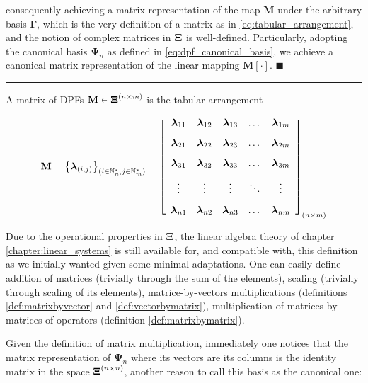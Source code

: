 	\noindent consequently achieving a matrix representation of the map $\mathbf{M}$ under the arbitrary basis $\boldsymbol{\Gamma}$, which is the very definition of a matrix as in \eqref{eq:tabular_arrangement}, and the notion of complex matrices in $\boldsymbol{\Xi}$ is well-defined. Particularly, adopting the canonical basis $\boldsymbol{\Psi}_n$ as defined in \eqref{eq:dpf_canonical_basis}, we achieve a canonical matrix representation of the linear mapping $\mathbf{M}\left[\cdot\right]$.
\hfill$\blacksquare$\vspace{5mm}\hrule\vspace{5mm} %

\begin{definition}\label{def:matrices_in_dps} A matrix of DPFs $\mathbf{M}\in\boldsymbol{\Xi}^{(n\times m)}$ is the tabular arrangement 

\begin{equation} \mathbf{M} = \left\{\boldsymbol{\lambda}_{(i,j)}\right\}_{(i\in \mathbb{N}^*_n,j\in \mathbb{N}^*_m)} = \left[\begin{array}{ccccc} 
	\boldsymbol{\lambda}_{11} & \boldsymbol{\lambda}_{12} & \boldsymbol{\lambda}_{13} & \dots  & \boldsymbol{\lambda}_{1m} \\[3mm]
	\boldsymbol{\lambda}_{21} & \boldsymbol{\lambda}_{22} & \boldsymbol{\lambda}_{23} & \dots  & \boldsymbol{\lambda}_{2m} \\[3mm]
	\boldsymbol{\lambda}_{31} & \boldsymbol{\lambda}_{32} & \boldsymbol{\lambda}_{33} & \dots  & \boldsymbol{\lambda}_{3m} \\[3mm]
	\vdots    & \vdots    & \vdots    & \ddots & \vdots    \\[3mm]
	\boldsymbol{\lambda}_{n1} & \boldsymbol{\lambda}_{n2} & \boldsymbol{\lambda}_{n3} & \dots  & \boldsymbol{\lambda}_{nm}
\end{array}\right]_{(n\times m)}\label{eq:dpfs_matrix} \end{equation}
\end{definition}

	Due to the operational properties in $\boldsymbol{\Xi}$, the linear algebra theory of chapter \ref{chapter:linear_systems} is still available for, and compatible with, this definition as we initially wanted given some minimal adaptations. One can easily define addition of matrices (trivially through the sum of the elements), scaling (trivially through scaling of its elements), matrice-by-vectors multiplications (definitions \ref{def:matrixbyvector} and \ref{def:vectorbymatrix}), multiplication of matrices by matrices of operators (definition \ref{def:matrixbymatrix}).

	Given the definition of matrix multiplication, immediately one notices that the matrix representation of $\boldsymbol{\Psi}_n$ where its vectors are its columns is the identity matrix in the space $\boldsymbol{\Xi}^{(n\times n)}$, another reason to call this basis as the canonical one:

